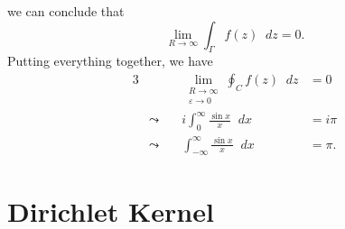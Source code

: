\documentclass[a4paper]{article}
\newcommand*\diff{\mathop{}\!d} %
\theoremstyle{definition}
\begin{document}
we can conclude that
\begin{equation*}
    \lim_{R \to \infty} \int_{\Gamma} f(z) \diff z = 0.
\end{equation*}
Putting everything together, we have
\begin{alignat*}{3}
     &                & \lim_{\substack{R \to \infty                              \\ \varepsilon \to 0}} \oint_{C} f(z) \diff z & = 0 \\
     & \leadsto \quad & i\int_{0}^{\infty} \frac{\sin x}{x} \diff x      & = i\pi \\
     & \leadsto \quad & \int_{-\infty}^{\infty} \frac{\sin x}{x} \diff x & = \pi.
\end{alignat*}

\section{Dirichlet Kernel}
\end{document}

